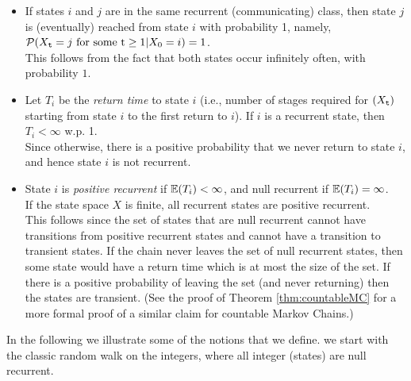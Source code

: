 \begin{itemize}
\item
If states $i$ and $j$ are in the same recurrent (communicating)
class, then state $j$ is (eventually) reached from state $i$ with
probability 1, namely,  ${\cal P}({X_{\tt t}} = j{\textrm{ for some t}} \ge
1|{X_0} = i) = 1$.\\
This follows from the fact that both states occur infinitely often,
with probability $1$.
\item
Let ${T_i}$ be the {\em return time} to state $i$  (i.e., number of stages
required for $({X_{\tt t}})$ starting from state $i$ to the first
return to $i$). If $i$ is a recurrent
state, then ${T_i} < \infty $ w.p. 1.\\
Since otherwise, there is a positive probability that we never
return to state $i$, and hence state $i$ is not recurrent.
%
\item State $i$ is {\em positive recurrent} if  $\mathbb{E}({T_i}) < \infty $,
and null recurrent if $\mathbb{E}({T_i}) = \infty $.\\
If the state space $X$
is finite, all recurrent states are positive recurrent.\\
This follows since the set of states that are null recurrent cannot
have transitions from positive recurrent states and cannot have a
transition to transient states. If the chain never leaves the set of
null recurrent states, then some state would have a return time
which is at most the size of the set. If there is a positive
probability of leaving the set (and never returning) then the states
are transient. (See the proof of Theorem \ref{thm:countableMC} for a more formal proof of a similar claim for countable Markov Chains.)
\end{itemize}

In the following we illustrate some of the notions that we define. we start with the classic random walk on the integers, where all integer (states) are null recurrent.

